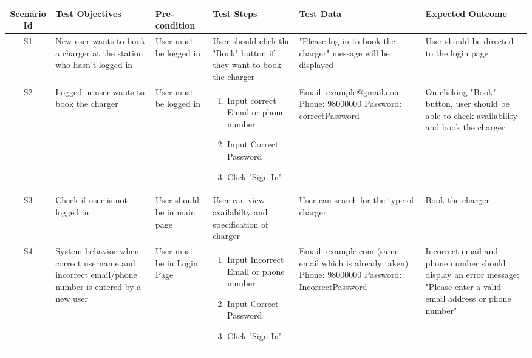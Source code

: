 \newpage
\begin{landscape}
    \begin{table}[h]
\centering
\begin{tabular}{|c|p{3cm}|p{2.5cm}|p{3.5cm}|p{3.5cm}|p{3.5cm}|}
\hline
Scenario Id & Test Objectives & Pre-condition & Test Steps & Test Data & Expected Outcome \\
\hline
S1 & New user wants to book a charger at the station who hasn't logged in & User must be logged in &  User should click the "Book" button if they want to book the charger
 & "Please log in to book the charger" message will be displayed & User should be directed to the login page \\
\hline
S2 & Logged in user wants to book the charger & User must be logged in & \begin{enumerate}
    \item Input correct Email or phone number
    \item Input Correct Password
    \item Click "Sign In"
\end{enumerate} & Email: example@gmail.com Phone: 98000000  Password: correctPassword & On clicking "Book" button, user should be able to check availability and book the charger \\
\hline
S3 & Check if user is not logged in & User should be in main page & User can view availabilty and specification of charger & User can search for the type of charger & Book the charger \\
\hline
S4 & System behavior when correct username and incorrect email/phone number is entered by a new user & User must be in Login Page & \begin{enumerate}
    \item Input Incorrect Email or phone number
    \item Input Correct Password
    \item Click "Sign In"
\end{enumerate} & Email: example.com (same email which is already taken) Phone: 98000000  Password: IncorrectPassword & Incorrect email and phone number should display an error message: "Please enter a valid email address or phone number" \\
\hline
\end{tabular}
\end{table}
\end{landscape}
